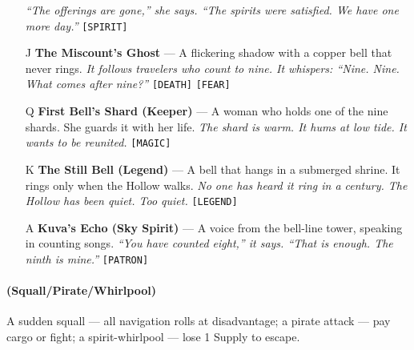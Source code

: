 \begin{enumerate}
  \hfill \textit{``The offerings are gone,'' she says. ``The spirits were satisfied. We have one more day.''} \texttt{[SPIRIT]}
\item[J] \textbf{The Miscount's Ghost} --- A flickering shadow with a copper bell that never rings.
  \hfill \textit{It follows travelers who count to nine. It whispers: ``Nine. Nine. What comes after nine?''} \texttt{[DEATH]} \texttt{[FEAR]}
\item[Q] \textbf{First Bell's Shard (Keeper)} --- A woman who holds one of the nine shards. She guards it with her life.
  \hfill \textit{The shard is warm. It hums at low tide. It wants to be reunited.} \texttt{[MAGIC]}
\item[K] \textbf{The Still Bell (Legend)} --- A bell that hangs in a submerged shrine. It rings only when the Hollow walks.
  \hfill \textit{No one has heard it ring in a century. The Hollow has been quiet. Too quiet.} \texttt{[LEGEND]}
\item[A] \textbf{Kuva's Echo (Sky Spirit)} --- A voice from the bell-line tower, speaking in counting songs.
  \hfill \textit{``You have counted eight,'' it says. ``That is enough. The ninth is mine.''} \texttt{[PATRON]}
\end{enumerate}

\paragraph*{(Squall/Pirate/Whirlpool)} A sudden squall --- all navigation rolls at disadvantage; a pirate attack --- pay cargo or fight; a spirit-whirlpool --- lose 1 Supply to escape.

